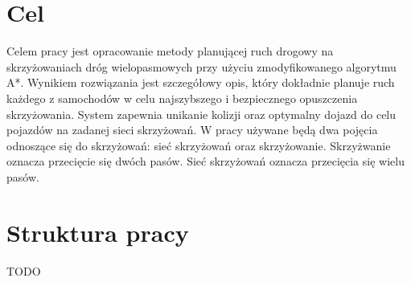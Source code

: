 \section{Cel}

Celem pracy jest opracowanie metody planującej ruch drogowy na skrzyżowaniach dróg wielopasmowych przy użyciu zmodyfikowanego algorytmu A*. 
\newline
\newline
Wynikiem rozwiązania jest szczegółowy opis, który dokładnie planuje ruch każdego z samochodów w celu najszybszego i bezpiecznego opuszczenia skrzyżowania.
\newline
\newline
System zapewnia unikanie kolizji oraz optymalny dojazd do celu pojazdów na zadanej sieci skrzyżowań.
\newline
\newline
W pracy używane będą dwa pojęcia odnoszące się do skrzyżowań: sieć skrzyżowań oraz skrzyżowanie. Skrzyżwanie oznacza przecięcie się dwóch pasów. Sieć skrzyżowań oznacza przecięcia się wielu pasów.

\section{Struktura pracy}
TODO
